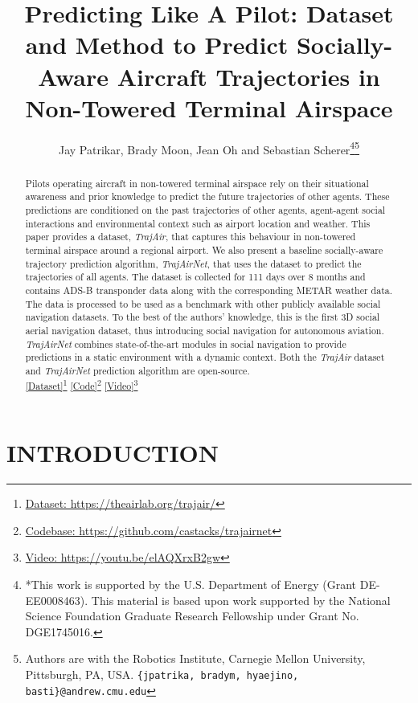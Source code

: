 \documentclass[letterpaper, 10 pt, conference]{ieeeconf}
\title{\LARGE \bf
Predicting Like A Pilot: Dataset and Method to Predict Socially-Aware Aircraft Trajectories in Non-Towered Terminal Airspace
}
\author{Jay Patrikar, Brady Moon, Jean Oh and Sebastian Scherer\thanks{*This work is supported by the U.S. Department of Energy (Grant DE-EE0008463). This material is based upon work supported by the National Science Foundation Graduate Research Fellowship under Grant No. DGE1745016.}\thanks{Authors are with the Robotics Institute, Carnegie Mellon University, Pittsburgh, PA, USA.
        {\tt\small \{jpatrika, bradym, hyaejino, basti\}@andrew.cmu.edu}}}
\begin{document}
\maketitle
\thispagestyle{empty}
\pagestyle{empty}


\begin{abstract}

Pilots operating aircraft in non-towered terminal airspace rely on their situational awareness and prior knowledge to predict the future trajectories of other agents. These predictions are conditioned on the past trajectories of other agents, agent-agent social interactions and environmental context such as airport location and weather. This paper provides a dataset, \textit{TrajAir}, that captures this behaviour in non-towered terminal airspace around a regional airport. We also present a baseline socially-aware trajectory prediction algorithm, \textit{TrajAirNet}, that uses the dataset to predict the trajectories of all agents. The dataset is collected for 111 days over 8 months and contains ADS-B transponder data along with the corresponding METAR weather data. The data is processed to be used as a benchmark with other publicly available social navigation datasets. To the best of the authors' knowledge, this is the first 3D social aerial navigation dataset, thus introducing social navigation for autonomous aviation. \textit{TrajAirNet} combines state-of-the-art modules in social navigation to provide predictions in a static environment with a dynamic context. Both the \textit{TrajAir} dataset and \textit{TrajAirNet} prediction algorithm are open-source.\\ \href{https://theairlab.org/trajair/}{[Dataset]}\footnote{\href{https://theairlab.org/trajair/}{Dataset: https://theairlab.org/trajair/}} \href{https://github.com/castacks/trajairnet}{[Code]}\footnote{ \href{https://github.com/castacks/trajairnet}{Codebase: https://github.com/castacks/trajairnet}}  
\href{https://youtu.be/elAQXrxB2gw}{[Video]}\footnote{ \href{https://youtu.be/elAQXrxB2gw}{Video: https://youtu.be/elAQXrxB2gw}}  

\end{abstract}


\section{INTRODUCTION}
\end{document}
